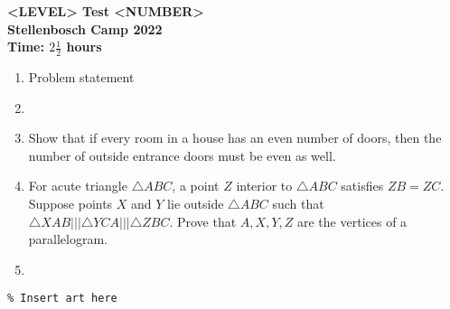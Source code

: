 \documentclass{article}
\begin{document}
\thispagestyle{empty}

\begin{center}
  \textbf{\Large <LEVEL> Test <NUMBER>}
  \\ \vspace{1em}
  \textbf{\large Stellenbosch Camp 2022}
  \\ \vspace{1em}
  \textbf{\large Time: $2\frac{1}{2}$ hours}
\end{center}

\bigskip

\begin{enumerate}[itemsep=\fill]

\item %
Problem statement


\item %


\item %
Show that if every room in a house has an even number of doors, then the number of outside entrance doors must be even as well.


\item %
For acute triangle $\triangle ABC$, a point $Z$ interior to $\triangle ABC$ satisfies $ZB=ZC$. Suppose points $X$ and $Y$ lie outside $\triangle ABC$ such that $\triangle XAB |||\triangle YCA |||\triangle ZBC$. Prove that $A,X,Y,Z$ are the vertices of a parallelogram. 


\item %

\end{enumerate}


\centering
\small
\begin{BVerbatim}
\end{BVerbatim}
\end{document}
